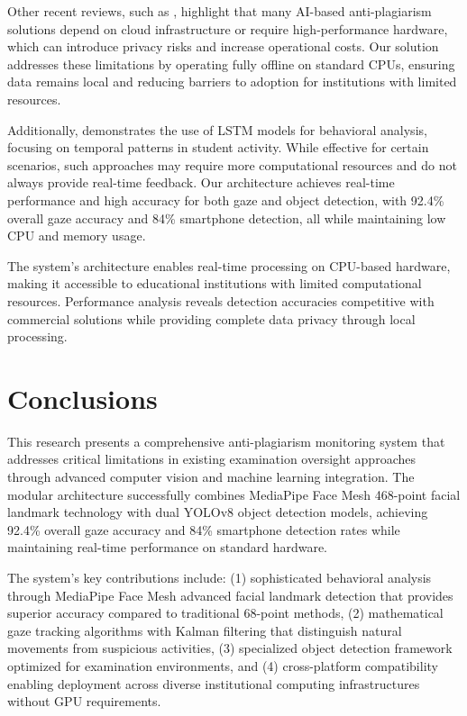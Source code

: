 \documentclass[conference]{IEEEtran}
\begin{document}
Other recent reviews, such as \cite{abbas2022review}, highlight that many AI-based anti-plagiarism solutions depend on cloud infrastructure or require high-performance hardware, which can introduce privacy risks and increase operational costs. Our solution addresses these limitations by operating fully offline on standard CPUs, ensuring data remains local and reducing barriers to adoption for institutions with limited resources.

Additionally, \cite{alsabhan2023} demonstrates the use of LSTM models for behavioral analysis, focusing on temporal patterns in student activity. While effective for certain scenarios, such approaches may require more computational resources and do not always provide real-time feedback. Our architecture achieves real-time performance and high accuracy for both gaze and object detection, with 92.4\% overall gaze accuracy and 84\% smartphone detection, all while maintaining low CPU and memory usage.

The system's architecture enables real-time processing on CPU-based hardware, making it accessible to educational institutions with limited computational resources. Performance analysis reveals detection accuracies competitive with commercial solutions while providing complete data privacy through local processing.

\section{Conclusions}

This research presents a comprehensive anti-plagiarism monitoring system that addresses 
critical limitations in existing examination oversight approaches through advanced 
computer vision and machine learning integration. The modular architecture successfully 
combines MediaPipe Face Mesh 468-point facial landmark technology with dual YOLOv8 
object detection models, achieving 92.4\% overall gaze accuracy and 84\% smartphone 
detection rates while maintaining real-time performance on standard hardware.

The system's key contributions include: (1) sophisticated behavioral analysis through 
MediaPipe Face Mesh advanced facial landmark detection that provides superior accuracy 
compared to traditional 68-point methods, (2) mathematical gaze tracking algorithms 
with Kalman filtering that distinguish natural movements from suspicious activities, 
(3) specialized object detection framework optimized for examination environments, 
and (4) cross-platform compatibility enabling deployment across diverse institutional 
computing infrastructures without GPU requirements.
\end{document}
